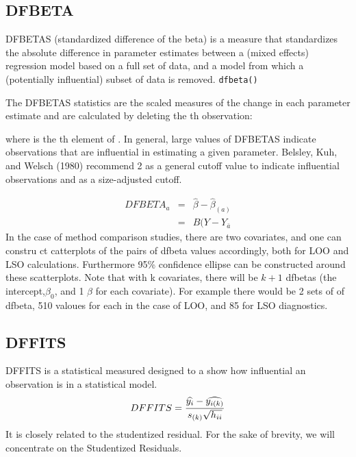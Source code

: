 \documentclass[Main.tex]{subfiles}
\begin{document}
	\subsection{DFBETA} %
	DFBETAS (standardized difference of the beta) is a measure that standardizes the absolute difference in parameter estimates between a (mixed effects) regression model based on a full set of data, and a model from which a (potentially influential) subset of data is removed.
	\texttt{dfbeta()}
	
	
	The DFBETAS statistics are the scaled measures of the change in each parameter estimate and are calculated by deleting the th observation:
	
	where  is the th element of .
	In general, large values of DFBETAS indicate observations that are influential in estimating a given parameter. Belsley, Kuh, and Welsch (1980) recommend 2 as a general cutoff value to indicate influential observations and  as a size-adjusted cutoff.
	
	\begin{eqnarray}
	DFBETA_{a} &=& \hat{\beta} - \hat{\beta}_{(a)} \\
	&=& B(Y-Y_{\bar{a}}
	\end{eqnarray}
	In the case of method comparison studies, there are two covariates, and one can constru
	ct catterplots of the pairs of dfbeta values accordingly, both for LOO and LSO calculations. Furthermore 95\% confidence ellipse can be constructed around these scatterplots.
	Note that with k covariates, there will be $k+1$ dfbetas (the intercept,$\beta_0$, and 1 $\beta$ for each covariate). For example there would be 2 sets of of dfbeta, 510 valoues for each in the case of LOO, and 85 for LSO diagnostics.
	
	
	
	\subsection{DFFITS} %
	DFFITS is a statistical measured designed to a show how influential an observation is in a statistical model. 
	\begin{displaymath} DFFITS = {\widehat{y_i} -
		\widehat{y_{i(k)}} \over s_{(k)} \sqrt{h_{ii}}} \end{displaymath}
	It is closely related to the studentized residual. For the sake of brevity, we will concentrate on the Studentized Residuals.
\end{document}
